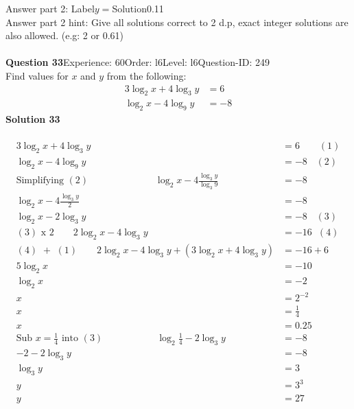 \documentclass{article}
\begin{document}
Answer part 2: \hspace{10pt}Label\hspace{10pt}$y=$\hspace{10pt}Solution\hspace{10pt}0.11\\
Answer part 2 hint: \hspace{15pt}Give all solutions correct to 2 d.p, exact integer solutions are also allowed. (e.g: 2 or 0.61)\\
\\[4pt]
\noindent\textbf{Question 33}\hspace{20pt}Experience: 60\hspace{20pt}Order: l6\hspace{20pt}Level: l6\hspace{20pt}Question-ID: 249\\[2pt]
Find values for $x$ and $y$ from the following:
\begin{align*}
3\log_{2}x+4\log_{3}y&=6\\[2pt]
\log_{2}x-4\log_{9}y&=-8
\end{align*}
\noindent\textbf{Solution 33}\\[2pt]
\\[-35pt]\begin{align*}
3\log_{2}x+4\log_{3}y&=6\qquad (1)\\[2pt]
\log_{2}x-4\log_{9}y&=-8\hspace{11pt}(2)\\[2pt]
\text{Simplifying}\,\,(2)\hspace{83pt}\log_{2}x-4\displaystyle\frac{\log_{3}y}{\log_{3}9}&=-8\\[2pt]
\log_{2}x-4\displaystyle\frac{\log_{3}y}{2}&=-8\\[2pt]
\log_{2}x-2\log_{3}y&=-8\hspace{11pt}(3)\\[2pt]
(3)\,\,\text{x}\,\,2\qquad 2\log_{2}x-4\log_{3}y&=-16\hspace{7pt}(4)\\[2pt]
(4)\,\,+\,\,(1)\qquad 2\log_{2}x-4\log_{3}y+(3\log_{2}x+4\log_{3}y)&=-16+6\\[2pt]
5\log_{2}x&=-10\\[2pt]
\log_{2}x&=-2\\[2pt]
x&=2^{-2}\\[2pt]
x&=\displaystyle\frac{1}{4}\\[2pt]
x&=0.25\\[12pt]
\text{Sub}\,\, x=\displaystyle\frac{1}{4}\,\,\text{into}\,\,(3)\hspace{67pt} \log_{2}\displaystyle\frac{1}{4}-2\log_{3}y&=-8\\[2pt]
-2-2\log_{3}y&=-8\\[2pt]
\log_{3}y&=3\\[2pt]
y&=3^3\\[2pt]
y&=27
\end{align*}
\end{document}
